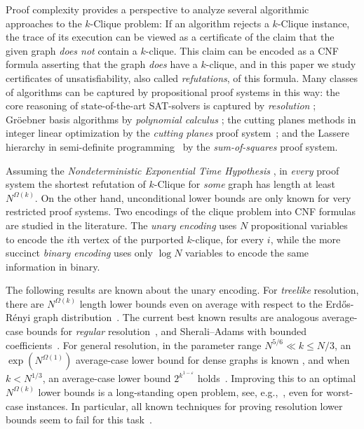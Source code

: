 \documentclass[10pt,a4paper]{article}
\theoremstyle{definition}
\theoremstyle{remark}
\theoremstyle{example}
\theoremstyle{plain}
\newcommand{\graphSize}{N}
\newcommand{\kClique}{$k$-\textsf{Clique}\xspace}
\providecommand{\erdosrenyi}{Erd\H{o}s-R\'{e}nyi\xspace}
\begin{document}
Proof complexity provides a perspective to analyze several algorithmic approaches to the \kClique problem:
If an algorithm rejects a \kClique instance, 
the trace of its execution can be viewed as a certificate 
of the claim that the given graph \emph{does not} contain a $k$-clique.
This claim can be encoded as a CNF formula asserting that the graph \emph{does} have a $k$-clique, and in this paper we  study certificates of unsatisfiability, also called \emph{refutations}, of this formula.  
Many classes of algorithms can be captured by propositional proof systems in this way: the core reasoning of state-of-the-art 
SAT-solvers is captured by \emph{resolution} \cite{BKS04}; Gr\"oebner basis algorithms by \emph{polynomial calculus} \cite{CEI96}; the cutting planes methods in integer linear optimization by the \emph{cutting planes} proof system~\cite{CCT87ComplexityCP};
and the Lassere hierarchy in semi-definite programming~\cite{Lasserre01} by the \emph{sum-of-squares} proof system. 

Assuming the \emph{Nondeterministic Exponential Time Hypothesis} \cite{CIMPR16}, in \emph{every} proof system the shortest refutation of \kClique for \emph{some} graph has length at least $\graphSize^{\Omega(k)}$.
On the other hand, unconditional lower bounds are only known for very restricted proof systems. 
Two encodings of the clique problem into CNF formulas are studied in the literature.
The \emph{unary encoding} uses $\graphSize$ propositional variables to encode the $i$th vertex of the purported $k$-clique, for every $i$,
while the more succinct \emph{binary encoding} uses only $\log \graphSize$ variables to encode the same information in binary. 

The following results are known about the unary encoding. 
For \emph{treelike} resolution, there are $\graphSize^{\Omega(k)}$ length lower bounds even 
on average 
with respect to the \erdosrenyi graph distribution~\cite{BGL13ParameterizedDPLL,Lauria18Cliques}. 
The current best known results are analogous average-case bounds for \emph{regular} resolution~\cite{ABdRLNR21Clique}, and Sherali--Adams with bounded coefficients~\cite{dRPR23UnarySA}.
For general resolution, in the parameter range $\graphSize^{5/6}\ll k \leq \graphSize/3$, an $\exp (\graphSize^{\Omega(1)})$ average-case lower bound for dense graphs is known
\cite{BIS07IndependentSets}, and when $k<\graphSize^{1/3}$, an average-case lower bound $2^{k^{1-\varepsilon}}$ holds~\cite{Pang21}.
Improving this to an optimal $\graphSize^{\Omega(k)}$ lower bounds is a long-standing open problem, see, e.g.,~\cite{BGLR12Parametrized,BN21ProofCplxSAT}, even for worst-case instances. 
In particular, all known techniques for proving resolution lower bounds seem to fail for this task~\cite{ABdRLNR21Clique}.
\end{document}
